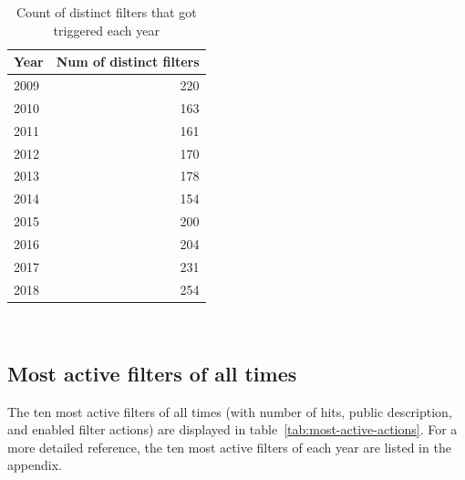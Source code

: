 \begin{table}
  \centering
  \begin{tabular}{l r }
    Year & Num of distinct filters \\
    \hline
    2009 & 220 \\
    2010 & 163 \\
    2011 & 161 \\
    2012 & 170 \\
    2013 & 178 \\
    2014 & 154 \\
    2015 & 200 \\
    2016 & 204 \\
    2017 & 231 \\
    2018 & 254 \\
  \end{tabular}
  \caption{Count of distinct filters that got triggered each year}~\label{tab:active-filters-count}
\end{table}

\subsection{Most active filters of all times}
The ten most active filters of all times (with number of hits, public description, and enabled filter actions) are displayed in table~\ref{tab:most-active-actions}.
For a more detailed reference, the ten most active filters of each year are listed in the appendix. %

